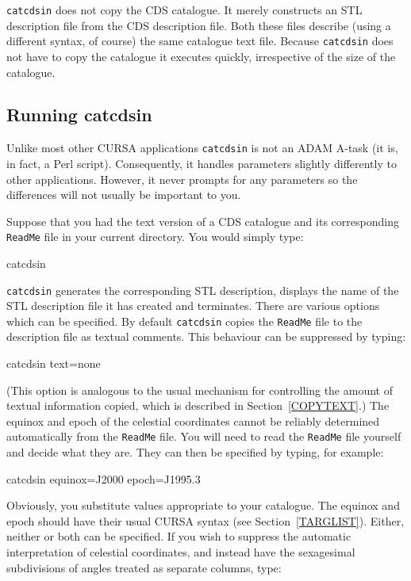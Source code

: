 \documentclass[twoside,11pt]{starlink}
\begin{document}
\texttt{catcdsin} does not copy the CDS catalogue.  It merely constructs
an STL description file from the CDS description file.  Both these
files describe (using a different syntax, of course) the same catalogue
text file.  Because \texttt{catcdsin} does not have to copy the catalogue
it executes quickly, irrespective of the size of the catalogue.

\subsection{Running catcdsin}

Unlike most other CURSA applications \texttt{catcdsin} is not an ADAM
A-task (it is, in fact, a Perl script).  Consequently, it handles
parameters slightly differently to other applications.  However,
it never prompts for any parameters so the differences will not usually
be important to you.

Suppose that you had the text version of a CDS catalogue and its
corresponding \texttt{ReadMe} file in your current directory.  You would
simply type:

\begin{terminalv}
catcdsin
\end{terminalv}

\texttt{catcdsin} generates the corresponding STL description, displays
the name of the STL description file it has created and terminates.
There are various options which can be specified.  By default \texttt{catcdsin} copies the \texttt{ReadMe} file to the description file as
textual comments.  This behaviour can be suppressed by typing:

\begin{terminalv}
catcdsin  text=none
\end{terminalv}

(This option is analogous to the usual mechanism for controlling the
amount of textual information copied, which is described in
Section~\ref{COPYTEXT}.)  The equinox and epoch of the celestial
coordinates cannot be reliably determined automatically from the
\texttt{ReadMe} file.  You will need to read the \texttt{ReadMe} file
yourself and decide what they are.  They can then be specified by
typing, for example:

\begin{terminalv}
catcdsin  equinox=J2000  epoch=J1995.3
\end{terminalv}

Obviously, you substitute values appropriate to your catalogue.  The
equinox and epoch should have their usual CURSA syntax (see
Section~\ref{TARGLIST}).  Either, neither or both can be specified.
If you wish to suppress the automatic interpretation of celestial
coordinates, and instead have the sexagesimal subdivisions of angles
treated as separate columns, type:
\end{document}
